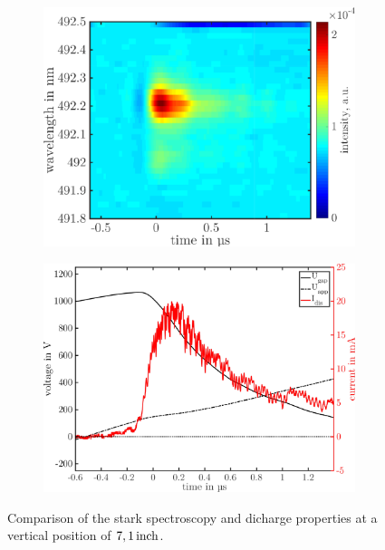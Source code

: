 \documentclass[a4paper,10pt]{article}
\begin{document}
				\begin{figure}
					\centering
					\begin{subfigure}[t]{0.5\textwidth}
						\includegraphics[width=\textwidth]{figures/stark/stark_71in.pdf}
					\end{subfigure}
					\begin{subfigure}[b]{0.5\textwidth}
						\includegraphics[width=\textwidth]{figures/stark/currentdis71.pdf}
					\end{subfigure}
					\caption{Comparison of the stark spectroscopy and dicharge properties at a vertical position of $\unit[7,1]{inch}$. }
					\label{img:stark71comparison}
				\end{figure}
\end{document}
